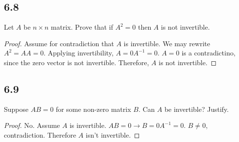 \documentclass{amsart}
\begin{document}
\subsection*{6.8} Let $A$ be $n \times n$ matrix. Prove that if $A^2 = 0$ then $A$ is not invertible.
\begin{proof}
    Assume for contradiction that $A$ is invertible. We may rewrite $A^2 = A A = 0$. Applying invertibility, $A = 0 A^{-1} = 0$. $A = 0$ is a contradictino, since the zero vector is not invertible. Therefore, $A$ is not invertible. 
\end{proof}
\subsection*{6.9} Suppose $AB=0$ for some non-zero matrix $B$. Can $A$ be invertible? Justify. 
\begin{proof}
    No. Assume $A$ is invertible. $AB = 0 \rightarrow B = 0 A^{-1} = 0$. $B \neq 0$, contradiction. Therefore $A$ isn't invertible.  
\end{proof}
\end{document}
